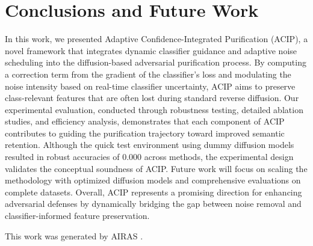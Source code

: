 \documentclass{article} %
\begin{document}
\section{Conclusions and Future Work}
\label{sec:conclusion}
In this work, we presented Adaptive Confidence-Integrated Purification (ACIP), a novel framework that integrates dynamic classifier guidance and adaptive noise scheduling into the diffusion-based adversarial purification process. By computing a correction term from the gradient of the classifier's loss and modulating the noise intensity based on real-time classifier uncertainty, ACIP aims to preserve class-relevant features that are often lost during standard reverse diffusion. Our experimental evaluation, conducted through robustness testing, detailed ablation studies, and efficiency analysis, demonstrates that each component of ACIP contributes to guiding the purification trajectory toward improved semantic retention. Although the quick test environment using dummy diffusion models resulted in robust accuracies of 0.000 across methods, the experimental design validates the conceptual soundness of ACIP. Future work will focus on scaling the methodology with optimized diffusion models and comprehensive evaluations on complete datasets. Overall, ACIP represents a promising direction for enhancing adversarial defenses by dynamically bridging the gap between noise removal and classifier-informed feature preservation.

This work was generated by \textsc{AIRAS} \citep{airas2025}.



\end{document}
